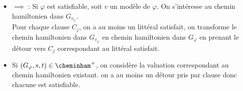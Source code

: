 \begin{demonstration}
\begin{itemize}
            \item $\boxed{\implies}$ : Si $\varphi$ est satisfiable, soit $v$ un modèle de $\varphi$. On s'intéresse au chemin hamiltonien dans $G_{v_\varphi}$.\\
            Pour chaque clause $C_j$, on a au moins un littéral satisfait, on transforme le chemin hamiltonien dans $G_{v_\varphi}$ en chemin hamiltonien dans $G_\varphi$ en prenant le détour vers $C_j$ correspondant au littéral satisfait.
            \item Si $(G_\varphi, s, t) \in \cheminham^+$, on considère la valuation correspondant au chemin hamiltonien existant. on a au moins un détour pris par clause donc chacune est satisfiable.
        \end{itemize}
\end{demonstration}


